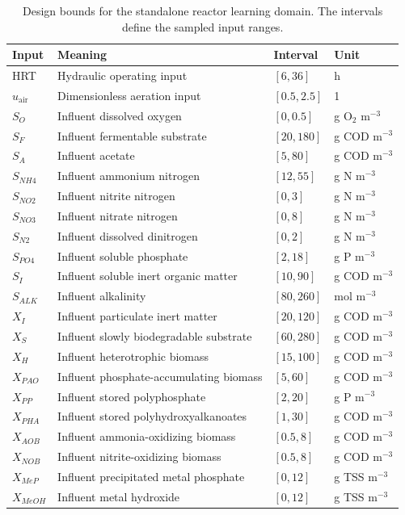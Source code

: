 \begin{table}[htbp]
\centering\small
\caption{Design bounds for the standalone reactor learning domain. The intervals define the sampled input ranges.}\label{tab:reactor_sampling_domain}
\begin{tabular}{lp{5.7cm}ll}
\toprule
Input & Meaning & Interval & Unit\\
\midrule
HRT & Hydraulic operating input & $[6,36]$ & h\\
$u_{\mathrm{air}}$ & Dimensionless aeration input & $[0.5,2.5]$ & 1\\
$S_O$ & Influent dissolved oxygen & $[0,0.5]$ & g O$_2$ m$^{-3}$\\
$S_F$ & Influent fermentable substrate & $[20,180]$ & g COD m$^{-3}$\\
$S_A$ & Influent acetate & $[5,80]$ & g COD m$^{-3}$\\
$S_{NH4}$ & Influent ammonium nitrogen & $[12,55]$ & g N m$^{-3}$\\
$S_{NO2}$ & Influent nitrite nitrogen & $[0,3]$ & g N m$^{-3}$\\
$S_{NO3}$ & Influent nitrate nitrogen & $[0,8]$ & g N m$^{-3}$\\
$S_{N2}$ & Influent dissolved dinitrogen & $[0,2]$ & g N m$^{-3}$\\
$S_{PO4}$ & Influent soluble phosphate & $[2,18]$ & g P m$^{-3}$\\
$S_I$ & Influent soluble inert organic matter & $[10,90]$ & g COD m$^{-3}$\\
$S_{ALK}$ & Influent alkalinity & $[80,260]$ & mol m$^{-3}$\\
$X_I$ & Influent particulate inert matter & $[20,120]$ & g COD m$^{-3}$\\
$X_S$ & Influent slowly biodegradable substrate & $[60,280]$ & g COD m$^{-3}$\\
$X_H$ & Influent heterotrophic biomass & $[15,100]$ & g COD m$^{-3}$\\
$X_{PAO}$ & Influent phosphate-accumulating biomass & $[5,60]$ & g COD m$^{-3}$\\
$X_{PP}$ & Influent stored polyphosphate & $[2,20]$ & g P m$^{-3}$\\
$X_{PHA}$ & Influent stored polyhydroxyalkanoates & $[1,30]$ & g COD m$^{-3}$\\
$X_{AOB}$ & Influent ammonia-oxidizing biomass & $[0.5,8]$ & g COD m$^{-3}$\\
$X_{NOB}$ & Influent nitrite-oxidizing biomass & $[0.5,8]$ & g COD m$^{-3}$\\
$X_{MeP}$ & Influent precipitated metal phosphate & $[0,12]$ & g TSS m$^{-3}$\\
$X_{MeOH}$ & Influent metal hydroxide & $[0,12]$ & g TSS m$^{-3}$\\
\bottomrule
\end{tabular}
\end{table}

